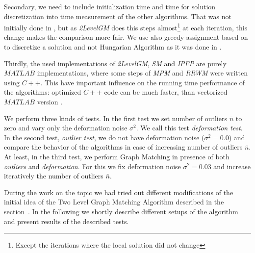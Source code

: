 Secondary, we need to include initialization time and time for solution discretization into time measurement of the other algorithms. That was not initially done in \cite{Cho2014_Haystack}, but as \emph{2LevelGM} does this steps almost\footnote{Except the iterations where the local solution did not change} at each iteration, this change makes the comparison more fair. We use also greedy assignment based on \cite{Leordeanu2005_SM} to discretize a solution and not Hungarian Algorithm as it was done in \cite{Cho2014_Haystack}.

Thirdly, the used implementations of \emph{2LevelGM}, \emph{SM} and \emph{IPFP} are purely $MATLAB$ implementations, where some steps of \emph{MPM} and \emph{RRWM} were written using $C++$. This have important influence on the running time performance of the algorithms: optimized $C++$ code can be much faster, than vectorized $MATLAB$ version .

We perform three kinds of tests. In the first test we set number of outliers $\bar{n}$ to zero and vary only the deformation noise $\sigma^2$. We call this test \emph{deformation test}. In the second test, \emph{outlier test}, we do not have deformation noise ($\sigma^2= 0.0$) and compare the behavior of the algorithms in case of increasing number of outliers $\bar{n}$. At least, in the third test, we perform Graph Matching in presence of both \emph{outliers} and \emph{deformation}. For this we fix deformation noise $\sigma^2= 0.03$ and increase iteratively the number of outliers $\bar{n}$. 

During the work on the topic we had tried out different modifications of the initial idea of the Two Level Graph Matching Algorithm described in the section~. In the following we shortly describe different setups of the algorithm and present results of the described tests.

